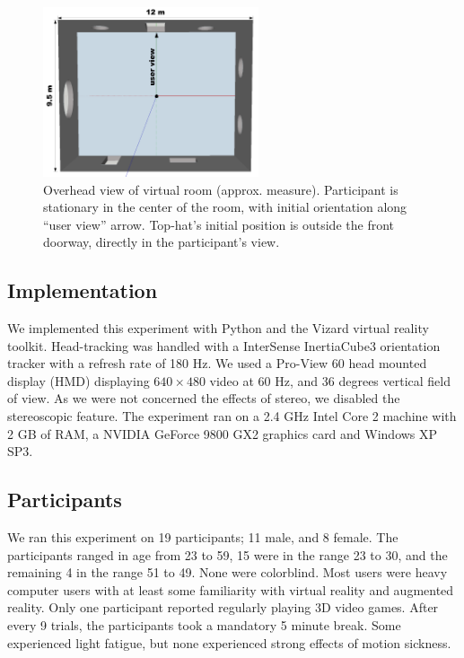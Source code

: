 \documentclass{acmsiggraph}                     %
\begin{document}
\begin{figure}[t]
	\centering
	\includegraphics[width=2.5in]{figures/augmentedroom.png}
	\caption{Overhead view of virtual room (approx. measure).  Participant is stationary in the center of the room, with initial orientation along ``user view'' arrow.  Top-hat's initial position is outside the front doorway, directly in the participant's view.}
\end{figure}

\subsection{Implementation}

We implemented this experiment with Python and the Vizard virtual reality toolkit.  Head-tracking was handled with a InterSense InertiaCube3 orientation tracker with a refresh rate of 180 Hz.  We used a Pro-View 60 head mounted display (HMD) displaying $640\times480$ video at 60 Hz, and 36 degrees vertical field of view.  As we were not concerned the effects of stereo, we disabled the stereoscopic feature.  The experiment ran on a 2.4 GHz Intel Core 2 machine with 2 GB of RAM, a NVIDIA GeForce 9800 GX2 graphics card and Windows XP SP3.

\subsection{Participants}

We ran this experiment on 19 participants; 11 male, and 8 female.  The participants ranged in age from 23 to 59, 15 were in the range 23 to 30, and the remaining 4 in the range 51 to 49.  None were colorblind.  Most users were heavy computer users with at least some familiarity with virtual reality and augmented reality.  Only one participant reported regularly playing 3D video games.  After every 9 trials, the participants took a mandatory 5 minute break.  Some experienced light fatigue, but none experienced strong effects of motion sickness.
\end{document}
